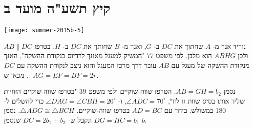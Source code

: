 

\np

\section{קיץ תשע"ה מועד ב}

\begin{center}
\texttt{[image: summer-2015b-5]}
\end{center}
נוריד אנך מ-%
$A$
שחתוך את
$DC$
ב-%
$G$,
ואנך מ-%
$B$
שחותך את 
$DC$
ב-%
$H$.
בטרפז
$AB\|DC$
ולכן
$ABHG$
הוא מלבן. לפי משפט
$77$
"המשיק למעגל מאונך לרדיוס בנקודת ההשקה", האנך מנקודת ההשקה של מעגל עם
$AB$
עובר דרך מרכז המעגל והוא ניצב לנקודת ההשקה עם
$DC$.
מכאן ש-%
$AG=EF=BF=2r$.

נסמן
$AB=GH=b_2$.
הטרפז שווה-שוקיים ולפי משפט
$39$
"בטרפז שווה-שוקיים הזוויות שליד אותו בסיס שוות זו לזו",
$\angle ADC=70^\circ$,
ו-%
$\angle DAG=\angle CBH=20^\circ$
כדי להשלים ל-%
$180$
במשולש. ביחד עם 
$AD=BC$
בטרפז שווה-שוקיים,
$\triangle ADG \cong \triangle BCH$.
נסמן
$DG=HC=b_1$
ונקבל ש-%
$DC=2b_1+b_2$
שנסמן
$b$.

